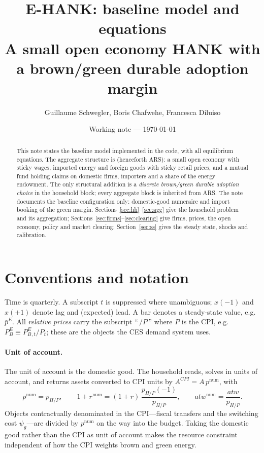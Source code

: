\documentclass[11pt]{article}
\title{\textbf{E-HANK: baseline model and equations}\\[2pt]
\large A small open economy HANK with a brown/green durable adoption margin}
\author{Guillaume Schwegler, Boris Chafwehe, Francesca Diluiso}
\date{Working note --- \today}
\newcommand{\num}{\mathrm{num}}
\newcommand{\PEB}{P^{E}_{B}}
\newcommand{\pE}{p^{E}}
\begin{document}
\maketitle

\begin{abstract}
\noindent This note states the baseline model implemented in the code, with all
equilibrium equations. The aggregate structure is \cite{ARS2024} (henceforth
ARS): a small open economy with sticky wages, imported energy and foreign goods
with sticky retail prices, and a mutual fund holding claims on domestic firms,
importers and a share of the energy endowment. The only structural addition is
a \emph{discrete brown/green durable adoption choice} in the household block;
every aggregate block is inherited from ARS. The note documents the baseline
configuration only: domestic-good numeraire and import booking of the green
margin. Sections~\ref{sec:hh}--\ref{sec:agg} give the household problem and its
aggregation; Sections~\ref{sec:firms}--\ref{sec:clearing} give firms, prices,
the open economy, policy and market clearing; Section~\ref{sec:ss} gives the
steady state, shocks and calibration.
\end{abstract}

\section{Conventions and notation}

Time is quarterly. A subscript $t$ is suppressed where unambiguous; $x(-1)$ and
$x(+1)$ denote lag and (expected) lead. A bar denotes a steady-state value,
e.g.\ $\bar\pE$. All \emph{relative prices} carry the subscript ``\,$/P$\,''
where $P$ is the CPI, e.g.\ $\PEB\equiv \PEB{}_{,t}/P_t$; these are the objects
the CES demand system uses.

\paragraph{Unit of account.} The unit of account is the domestic good. The
household reads, solves in units of account, and returns assets converted to CPI
units by $A^{CPI}=A\,p^{\num}$, with
\begin{equation}
p^{\num}=p_{H/P},\qquad
1+r^{\num}=(1+r)\,\frac{p_{H/P}(-1)}{p_{H/P}},\qquad
atw^{\num}=\frac{atw}{p_{H/P}} .
\end{equation}
Objects contractually denominated in the CPI---fiscal transfers and the
switching cost $\psi_g$---are divided by $p^{\num}$ on the way into the budget.
Taking the domestic good rather than the CPI as unit of account makes the
resource constraint independent of how the CPI weights brown and green energy.
\end{document}
